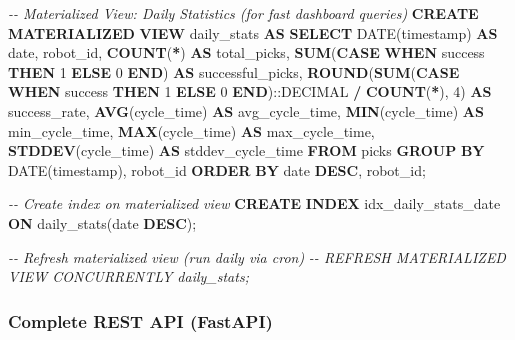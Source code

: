 \documentclass[
]{article}
\newenvironment{Shaded}{\begin{snugshade}}{\end{snugshade}}
\newcommand{\CharTok}[1]{\textcolor[rgb]{0.31,0.60,0.02}{#1}}
\newcommand{\CommentTok}[1]{\textcolor[rgb]{0.56,0.35,0.01}{\textit{#1}}}
\newcommand{\ControlFlowTok}[1]{\textcolor[rgb]{0.13,0.29,0.53}{\textbf{#1}}}
\newcommand{\DataTypeTok}[1]{\textcolor[rgb]{0.13,0.29,0.53}{#1}}
\newcommand{\DecValTok}[1]{\textcolor[rgb]{0.00,0.00,0.81}{#1}}
\newcommand{\FunctionTok}[1]{\textcolor[rgb]{0.13,0.29,0.53}{\textbf{#1}}}
\newcommand{\KeywordTok}[1]{\textcolor[rgb]{0.13,0.29,0.53}{\textbf{#1}}}
\newcommand{\NormalTok}[1]{#1}
\newcommand{\OperatorTok}[1]{\textcolor[rgb]{0.81,0.36,0.00}{\textbf{#1}}}
\begin{document}
\begin{Shaded}
\begin{Highlighting}[]
\CommentTok{{-}{-} Materialized View: Daily Statistics (for fast dashboard queries)}
\KeywordTok{CREATE} \KeywordTok{MATERIALIZED} \KeywordTok{VIEW}\NormalTok{ daily\_stats }\KeywordTok{AS}
\KeywordTok{SELECT}
    \DataTypeTok{DATE}\NormalTok{(}\DataTypeTok{timestamp}\NormalTok{) }\KeywordTok{AS} \DataTypeTok{date}\NormalTok{,}
\NormalTok{    robot\_id,}
    \FunctionTok{COUNT}\NormalTok{(}\OperatorTok{*}\NormalTok{) }\KeywordTok{AS}\NormalTok{ total\_picks,}
    \FunctionTok{SUM}\NormalTok{(}\ControlFlowTok{CASE} \ControlFlowTok{WHEN}\NormalTok{ success }\ControlFlowTok{THEN} \DecValTok{1} \ControlFlowTok{ELSE} \DecValTok{0} \ControlFlowTok{END}\NormalTok{) }\KeywordTok{AS}\NormalTok{ successful\_picks,}
    \FunctionTok{ROUND}\NormalTok{(}\FunctionTok{SUM}\NormalTok{(}\ControlFlowTok{CASE} \ControlFlowTok{WHEN}\NormalTok{ success }\ControlFlowTok{THEN} \DecValTok{1} \ControlFlowTok{ELSE} \DecValTok{0} \ControlFlowTok{END}\NormalTok{):}\CharTok{:DECIMAL} \OperatorTok{/} \FunctionTok{COUNT}\NormalTok{(}\OperatorTok{*}\NormalTok{), }\DecValTok{4}\NormalTok{) }\KeywordTok{AS}\NormalTok{ success\_rate,}
    \FunctionTok{AVG}\NormalTok{(cycle\_time) }\KeywordTok{AS}\NormalTok{ avg\_cycle\_time,}
    \FunctionTok{MIN}\NormalTok{(cycle\_time) }\KeywordTok{AS}\NormalTok{ min\_cycle\_time,}
    \FunctionTok{MAX}\NormalTok{(cycle\_time) }\KeywordTok{AS}\NormalTok{ max\_cycle\_time,}
    \FunctionTok{STDDEV}\NormalTok{(cycle\_time) }\KeywordTok{AS}\NormalTok{ stddev\_cycle\_time}
\KeywordTok{FROM}\NormalTok{ picks}
\KeywordTok{GROUP} \KeywordTok{BY} \DataTypeTok{DATE}\NormalTok{(}\DataTypeTok{timestamp}\NormalTok{), robot\_id}
\KeywordTok{ORDER} \KeywordTok{BY} \DataTypeTok{date} \KeywordTok{DESC}\NormalTok{, robot\_id;}

\CommentTok{{-}{-} Create index on materialized view}
\KeywordTok{CREATE} \KeywordTok{INDEX}\NormalTok{ idx\_daily\_stats\_date }\KeywordTok{ON}\NormalTok{ daily\_stats(}\DataTypeTok{date} \KeywordTok{DESC}\NormalTok{);}

\CommentTok{{-}{-} Refresh materialized view (run daily via cron)}
\CommentTok{{-}{-} REFRESH MATERIALIZED VIEW CONCURRENTLY daily\_stats;}
\end{Highlighting}
\end{Shaded}

\hypertarget{complete-rest-api-fastapi}{%
\subsubsection{Complete REST API
(FastAPI)}\label{complete-rest-api-fastapi}}
\end{document}
